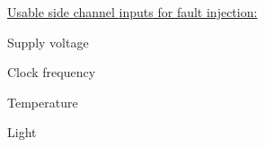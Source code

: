 \documentclass[landscape, a4paper]{article}
\begin{document}
\begin{minipage}[t]{0.2\pagewidth}
\begin{betterlist}
	\end{betterlist}
	\begin{betterlist}
		\item \underline{Usable side channel \alert{inputs} for fault injection:}
		\begin{betterlist}
			\item Supply voltage
			\item Clock frequency
			\item Temperature
			\item Light
		\end{betterlist}
	\end{betterlist}
\end{minipage}
\end{document}
